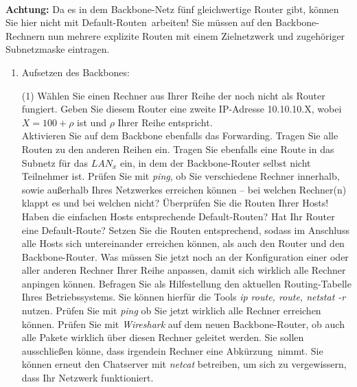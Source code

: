 \documentclass[paper=a4,fontsize=11pt]{scrartcl}%
\numberwithin{equation}{section}
\begin{document}
\vskip0.05in ~\\
\textbf{Achtung:} Da es in dem Backbone-Netz fünf gleichwertige Router gibt, können Sie hier nicht mit \glqq Default-Routen\grqq\ arbeiten! Sie müssen auf den Backbone-Rechnern nun mehrere explizite Routen mit einem Zielnetzwerk und zugehöriger Subnetzmaske eintragen.
\begin{enumerate}
	\item Aufsetzen des Backbones:
	\begin{tasks}(1)
		\task Wählen Sie einen Rechner aus Ihrer Reihe der noch nicht als Router fungiert. Geben Sie diesem Router eine zweite IP-Adresse 10.10.10.X, wobei $X=100 + \rho$ ist und $\rho$ Ihrer Reihe entspricht.\\
		\task Aktivieren Sie auf dem Backbone ebenfalls das Forwarding.
		\task Tragen Sie alle Routen zu den anderen Reihen ein. Tragen Sie ebenfalls eine Route in das Subnetz für das $LAN_x$ ein, in dem der Backbone-Router selbst nicht Teilnehmer ist.
		\task Prüfen Sie mit \emph{ping}, ob Sie verschiedene Rechner innerhalb, sowie außerhalb Ihres Netzwerkes erreichen können -- bei welchen Rechner(n) klappt es und bei welchen nicht?
		\task Überprüfen Sie die Routen Ihrer Hosts! Haben die einfachen Hosts entsprechende Default-Routen? Hat Ihr Router eine Default-Route? Setzen Sie die Routen entsprechend, sodass im Anschluss alle Hosts sich untereinander erreichen können, als auch den Router und den Backbone-Router.
		\task Was müssen Sie jetzt noch an der Konfiguration einer oder aller anderen Rechner Ihrer Reihe anpassen, damit sich wirklich alle Rechner anpingen können.
		\task Befragen Sie als Hilfestellung den aktuellen Routing-Tabelle Ihres Betriebssystems. Sie können hierfür die Tools \emph{ip route, route, netstat -r} nutzen.
		\task Prüfen Sie mit \emph{ping} ob Sie jetzt wirklich alle Rechner erreichen können.
		\task Prüfen Sie mit \emph{Wireshark} auf dem neuen Backbone-Router, ob auch alle Pakete wirklich über diesen Rechner geleitet werden. Sie sollen ausschließen könne, dass irgendein Rechner eine \glqq Abkürzung\grqq\ nimmt.
		\task Sie können erneut den Chatserver mit \emph{netcat} betreiben, um sich zu vergewissern, dass Ihr Netzwerk funktioniert.
	\end{tasks}
\end{enumerate}
\end{document}
